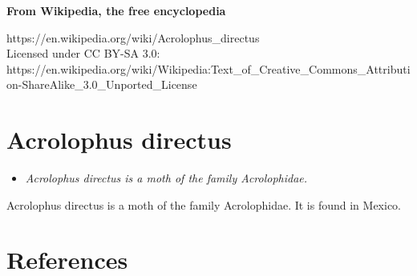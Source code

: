 \textbf{From Wikipedia, the free encyclopedia}

https://en.wikipedia.org/wiki/Acrolophus\_directus\\
Licensed under CC BY-SA 3.0:\\
https://en.wikipedia.org/wiki/Wikipedia:Text\_of\_Creative\_Commons\_Attribution-ShareAlike\_3.0\_Unported\_License

\section{Acrolophus directus}\label{acrolophus-directus}

\begin{itemize}
\item
  \emph{Acrolophus directus is a moth of the family Acrolophidae.}
\end{itemize}

Acrolophus directus is a moth of the family Acrolophidae. It is found in
Mexico.

\section{References}\label{references}
